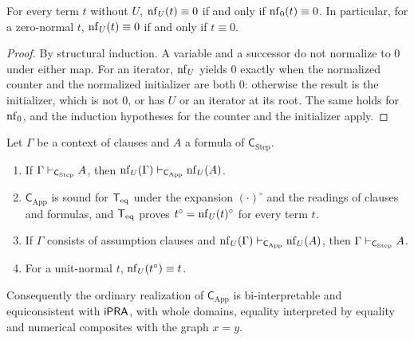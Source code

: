 \begin{lemma}
\label{comp:lem:unitzero}
For every term $t$ without $U$, $\operatorname{nf}_U(t)\equiv0$ if and only if
$\operatorname{nf}_0(t)\equiv0$. In particular, for a zero-normal $t$,
$\operatorname{nf}_U(t)\equiv0$ if and only if $t\equiv0$.
\end{lemma}

\begin{proof}
By structural induction. A variable and a successor do not normalize to
$0$ under either map. For an iterator, $\operatorname{nf}_U$ yields $0$ exactly when the
normalized counter and the normalized initializer are both $0$: otherwise
the result is the initializer, which is not $0$, or has $U$ or an iterator
at its root. The same holds for $\operatorname{nf}_0$, and the induction hypotheses for
the counter and the initializer apply.
\end{proof}

\begin{theorem}
\label{comp:thm:app}
Let $\Gamma$ be a context of clauses and $A$ a formula of
$\mathsf{C}_{\mathrm{Step}}$.
\begin{enumerate}[label=(\alph*)]
\item If $\Gamma\vdash_{\mathsf{C}_{\mathrm{Step}}}A$, then
 $\operatorname{nf}_U(\Gamma)\vdash_{\mathsf{C}_{\mathrm{App}}}\operatorname{nf}_U(A)$.
\item $\mathsf{C}_{\mathrm{App}}$ is sound for $\mathsf{T}_{\mathrm{eq}}$ under the expansion
 $(\cdot)^{\circ}$ and the readings of clauses and formulas, and $\mathsf{T}_{\mathrm{eq}}$
 proves $t^{\circ}=\operatorname{nf}_U(t)^{\circ}$ for every term $t$.
\item If $\Gamma$ consists of assumption clauses and
 $\operatorname{nf}_U(\Gamma)\vdash_{\mathsf{C}_{\mathrm{App}}}\operatorname{nf}_U(A)$, then
 $\Gamma\vdash_{\mathsf{C}_{\mathrm{Step}}}A$.
\item For a unit-normal $t$, $\operatorname{nf}_U(t^{\circ})\equiv t$.
\end{enumerate}
Consequently the ordinary realization of $\mathsf{C}_{\mathrm{App}}$ is
bi-interpretable and equiconsistent with $\mathsf{iPRA}$, with whole domains,
equality interpreted by equality and numerical composites with the graph
$x=y$.
\end{theorem}

